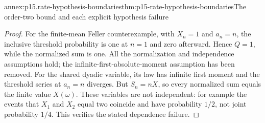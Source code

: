 \begin{annexitem}{annex:p15.rate-hypothesis-boundaries}{thm:p15-rate-hypothesis-boundaries}{The order-two bound and each explicit hypothesis failure}
\begin{proof}
For the finite-mean Feller counterexample, with \(X_n=1\) and
\(a_n=n\), the inclusive threshold probability is one at \(n=1\)
and zero afterward. Hence \(Q=1\), while the normalized sum is
one. All the normalization and independence assumptions hold;
the infinite-first-absolute-moment assumption has been removed.
For the shared dyadic variable, its law has infinite first moment
and the threshold series at \(a_n=n\) diverges. But
\(S_n=nX\), so every normalized sum equals the finite value
\(X(\omega)\). These variables are not independent: for example
the events that \(X_1\) and \(X_2\) equal two coincide and have
probability \(1/2\), not joint probability \(1/4\).
This verifies the stated dependence failure.
\end{proof}
\end{annexitem}

